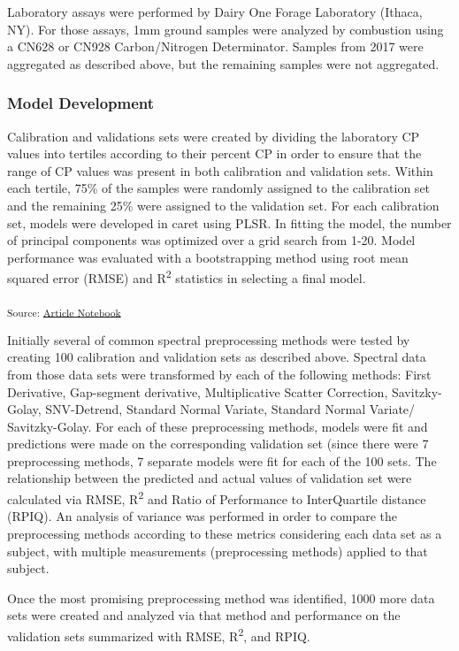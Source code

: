 \documentclass[
]{agujournal2019}
\begin{document}
Laboratory assays were performed by Dairy One Forage Laboratory (Ithaca,
NY). For those assays, 1mm ground samples were analyzed by combustion
using a CN628 or CN928 Carbon/Nitrogen Determinator. Samples from 2017
were aggregated as described above, but the remaining samples were not
aggregated.

\subsubsection{Model Development}\label{model-development}

Calibration and validations sets were created by dividing the laboratory
CP values into tertiles according to their percent CP in order to ensure
that the range of CP values was present in both calibration and
validation sets. Within each tertile, 75\% of the samples were randomly
assigned to the calibration set and the remaining 25\% were assigned to
the validation set. For each calibration set, models were developed in
caret using PLSR. In fitting the model, the number of principal
components was optimized over a grid search from 1-20. Model performance
was evaluated with a bootstrapping method using root mean squared error
(RMSE) and R\textsuperscript{2} statistics in selecting a final model.

\textsubscript{Source:
\href{https://rvcrawford.github.io/glowing-system/index.qmd.html}{Article
Notebook}}

Initially several of common spectral preprocessing methods were tested
by creating 100 calibration and validation sets as described above.
Spectral data from those data sets were transformed by each of the
following methods: First Derivative, Gap-segment derivative,
Multiplicative Scatter Correction, Savitzky-Golay, SNV-Detrend, Standard
Normal Variate, Standard Normal Variate/ Savitzky-Golay. For each of
these preprocessing methods, models were fit and predictions were made
on the corresponding validation set (since there were 7 preprocessing
methods, 7 separate models were fit for each of the 100 sets. The
relationship between the predicted and actual values of validation set
were calculated via RMSE, R\textsuperscript{2} and Ratio of Performance
to InterQuartile distance (RPIQ). An analysis of variance was performed
in order to compare the preprocessing methods according to these metrics
considering each data set as a subject, with multiple measurements
(preprocessing methods) applied to that subject.

Once the most promising preprocessing method was identified, 1000 more
data sets were created and analyzed via that method and performance on
the validation sets summarized with RMSE, R\textsuperscript{2}, and
RPIQ.
\end{document}
